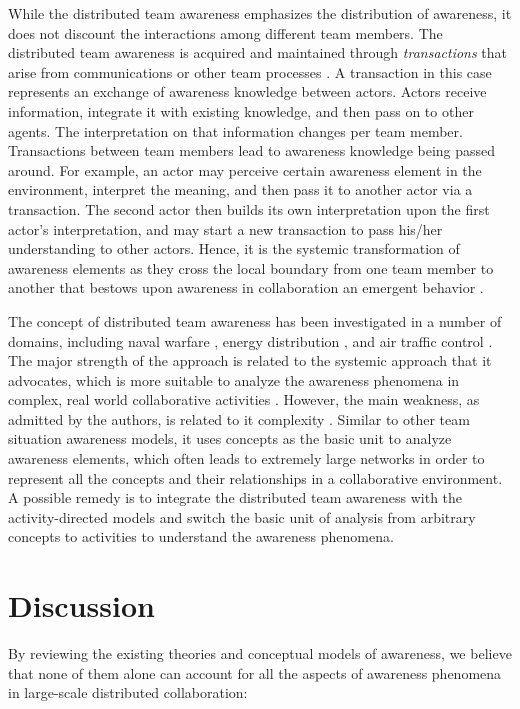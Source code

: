 While the distributed team awareness emphasizes the distribution of awareness, it does not discount the interactions among different team members. The distributed team awareness is acquired and maintained through \emph{transactions} that arise from communications or other team processes \cite{Salmon2010}. A transaction in this case represents an exchange of awareness knowledge between actors. Actors receive information, integrate it with existing knowledge, and then pass on to other agents. The interpretation on that information changes per team member. Transactions between team members lead to awareness knowledge being passed around. For example, an actor may perceive certain awareness element in the environment, interpret the meaning, and then pass it to another actor via a transaction. The second actor then builds its own interpretation upon the first actor's interpretation, and may start a new transaction to pass his/her understanding to other actors. Hence, it is the systemic transformation of awareness elements as they cross the local boundary from one team member to another that bestows upon awareness in collaboration an emergent behavior \cite{Stanton2009}.

The concept of distributed team awareness has been investigated in a number of domains, including naval warfare \cite{Stanton2006}, energy distribution \cite{Salmon2008a}, and air traffic control \cite{Stanton2009}. The major strength of the approach is related to the systemic approach that it advocates, which is more suitable to analyze the awareness phenomena in complex, real world collaborative activities \cite{Stanton2009}. However, the main weakness, as admitted by the authors, is related to it complexity \cite{Salmon2010}. Similar to other team situation awareness models, it uses concepts as the basic unit to analyze awareness elements, which often leads to extremely large networks in order to represent all the concepts and their relationships in a collaborative environment. A possible remedy is to integrate the distributed team awareness with the activity-directed models and switch the basic unit of analysis from arbitrary concepts to activities to understand the awareness phenomena.

\section{Discussion} %
\label{sec:discussion}
By reviewing the existing theories and conceptual models of awareness, we believe that none of them alone can account for all the aspects of awareness phenomena in large-scale distributed collaboration:

